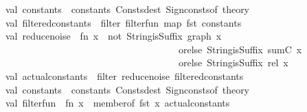 \begin{isabellebody}
\isanewline
\ \ \ \ val\ constants\ {\isacharequal}{\kern0pt}\ {\isacharhash}{\kern0pt}constants\ {\isacharparenleft}{\kern0pt}Consts{\isachardot}{\kern0pt}dest\ {\isacharparenleft}{\kern0pt}Sign{\isachardot}{\kern0pt}consts{\isacharunderscore}{\kern0pt}of\ {\isacharat}{\kern0pt}{\isacharbraceleft}{\kern0pt}theory{\isacharbraceright}{\kern0pt}{\isacharparenright}{\kern0pt}{\isacharparenright}{\kern0pt}\isanewline
\ \ \ \ val\ filtered{\isacharunderscore}{\kern0pt}constants\ {\isacharequal}{\kern0pt}\ filter\ {\isacharparenleft}{\kern0pt}filter{\isacharunderscore}{\kern0pt}fun{\isacharparenright}{\kern0pt}\ {\isacharparenleft}{\kern0pt}map\ fst\ constants{\isacharparenright}{\kern0pt}\isanewline
\isanewline
\ \ \ \ val\ reduce{\isacharunderscore}{\kern0pt}noise\ {\isacharequal}{\kern0pt}\ fn\ x\ {\isacharequal}{\kern0pt}{\isachargreater}{\kern0pt}\ not\ {\isacharparenleft}{\kern0pt}{\isacharparenleft}{\kern0pt}String{\isachardot}{\kern0pt}isSuffix\ {\isachardoublequote}{\kern0pt}{\isacharunderscore}{\kern0pt}graph{\isachardoublequote}{\kern0pt}\ x{\isacharparenright}{\kern0pt}\ \isanewline
\ \ \ \ \ \ \ \ \ \ \ \ \ \ \ \ \ \ \ \ \ \ \ \ \ \ \ \ \ \ \ \ \ \ \ \ \ \ \ \ orelse\ {\isacharparenleft}{\kern0pt}String{\isachardot}{\kern0pt}isSuffix\ {\isachardoublequote}{\kern0pt}{\isacharunderscore}{\kern0pt}sumC{\isachardoublequote}{\kern0pt}\ x{\isacharparenright}{\kern0pt}\ \isanewline
\ \ \ \ \ \ \ \ \ \ \ \ \ \ \ \ \ \ \ \ \ \ \ \ \ \ \ \ \ \ \ \ \ \ \ \ \ \ \ \ orelse\ {\isacharparenleft}{\kern0pt}String{\isachardot}{\kern0pt}isSuffix\ {\isachardoublequote}{\kern0pt}{\isacharunderscore}{\kern0pt}rel{\isachardoublequote}{\kern0pt}\ x{\isacharparenright}{\kern0pt}{\isacharparenright}{\kern0pt}\ \isanewline
\isanewline
\ \ \ \ val\ actual{\isacharunderscore}{\kern0pt}constants\ {\isacharequal}{\kern0pt}\ filter\ reduce{\isacharunderscore}{\kern0pt}noise\ filtered{\isacharunderscore}{\kern0pt}constants\isanewline
\isanewline
\ \ \ \ val\ constants\ {\isacharequal}{\kern0pt}\ {\isacharhash}{\kern0pt}constants\ {\isacharparenleft}{\kern0pt}Consts{\isachardot}{\kern0pt}dest\ {\isacharparenleft}{\kern0pt}Sign{\isachardot}{\kern0pt}consts{\isacharunderscore}{\kern0pt}of\ {\isacharat}{\kern0pt}{\isacharbraceleft}{\kern0pt}theory{\isacharbraceright}{\kern0pt}{\isacharparenright}{\kern0pt}{\isacharparenright}{\kern0pt}\isanewline
\ \ \ \ val\ filter{\isacharunderscore}{\kern0pt}fun{}\ {\isacharequal}{\kern0pt}\ fn\ x\ {\isacharequal}{\kern0pt}{\isachargreater}{\kern0pt}\ member{\isacharunderscore}{\kern0pt}of\ {\isacharparenleft}{\kern0pt}fst\ x{\isacharcomma}{\kern0pt}\ actual{\isacharunderscore}{\kern0pt}constants{\isacharparenright}{\kern0pt}\isanewline

\end{isabellebody}
